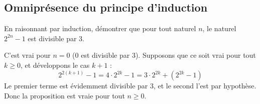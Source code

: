 \subsection{Omniprésence du principe d'induction}
En raisonnant par induction, démontrer que pour tout naturel $n$, le naturel $2^{2n}-1$ est divisible par $3$.

\begin{solution}
    C'est vrai pour $n = 0$ ($0$ est divisible par $3$). Supposons que ce soit vrai pour tout $k \geq 0$, et développons le cas $k+1$ :
    \[ 2^{2(k+1)} - 1 = 4 \cdot 2^{2k} - 1 = 3\cdot 2^{2k} + (2^{2k} - 1) \]
    Le premier terme est évidemment divisible par $3$, et le second l'est par hypothèse. Donc la proposition est vraie pour tout $n \geq 0$.
\end{solution}

